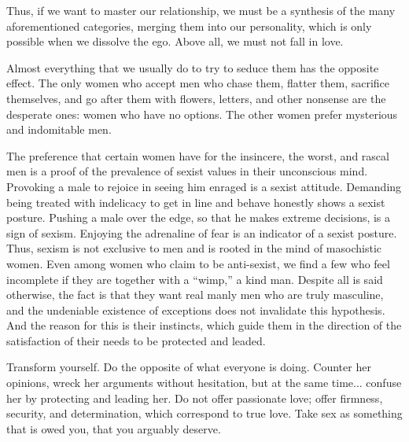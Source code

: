 \par Thus, if we want to master our relationship, we must be a synthesis of the many aforementioned categories, merging them into our personality, which is only possible when we dissolve the ego\footnotemark[12]. Above all, we must not fall in love.


\par Almost everything that we usually do to try to seduce them has the opposite effect. The only women who accept men who chase them, flatter them, sacrifice themselves, and go after them with flowers, letters, and other nonsense are the desperate ones: women who have no options. The other women prefer mysterious and indomitable men.

\par The preference that certain women have for the insincere, the worst, and rascal men is a proof of the prevalence of sexist values in their unconscious mind. Provoking a male to rejoice in seeing him enraged is a sexist attitude. Demanding being treated with indelicacy to get in line and behave honestly shows a sexist posture. Pushing a male over the edge, so that he makes extreme decisions, is a sign of sexism. Enjoying the adrenaline of fear is an indicator of a sexist posture. Thus, sexism is not exclusive to men and is rooted in the mind of masochistic women. Even among women who claim to be anti-sexist, we find a few who feel incomplete if they are together with a \enquote{wimp,} a kind man. Despite all is said otherwise, the fact is that they want real manly men who are truly masculine, and the undeniable existence of exceptions does not invalidate this hypothesis. And the reason for this is their instincts, which guide them in the direction of the satisfaction of their needs to be protected and leaded.

\par Transform yourself. Do the opposite of what everyone is doing. Counter her opinions, wreck her arguments without hesitation, but at the same time... confuse her by protecting and leading her. Do not offer passionate love; offer firmness, security, and determination, which correspond to true love. Take sex as something that is owed you, that you arguably deserve.